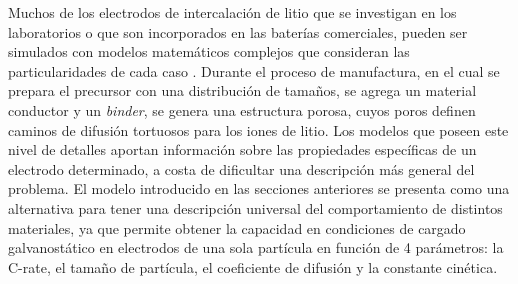 Muchos de los electrodos de intercalación de litio que se investigan en los 
laboratorios o que son incorporados en las baterías comerciales, pueden ser simulados
con modelos matemáticos complejos que consideran las particularidades de cada
caso \cite{doyle1995}. Durante el proceso de manufactura, en el cual se prepara
el precursor con una distribución de tamaños, se agrega un material conductor y
un \textit{binder}, se genera una estructura porosa, cuyos poros definen
caminos de difusión tortuosos para los iones de litio. Los modelos que poseen
este nivel de detalles \cite{doyle1995} aportan información sobre las propiedades
específicas de un electrodo determinado, a costa de dificultar una descripción
más general del problema. El modelo introducido en las secciones anteriores 
se presenta como una alternativa para tener una descripción universal del 
comportamiento de distintos materiales, ya que permite obtener la capacidad en 
condiciones de cargado galvanostático en electrodos de una sola partícula en 
función de 4 parámetros: la C-rate, el tamaño de partícula, el coeficiente de 
difusión y la constante cinética.

